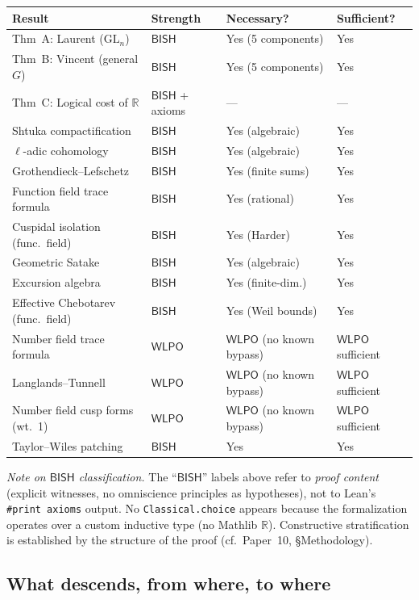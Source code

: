 \documentclass[11pt]{article}
\theoremstyle{plain}
\theoremstyle{definition}
\theoremstyle{remark}
\newcommand{\R}{\mathbb{R}}
\newcommand{\GL}{\mathrm{GL}}
\newcommand{\BISH}{\mathsf{BISH}}
\newcommand{\WLPO}{\mathsf{WLPO}}
\begin{document}
\begin{center}
\begin{tabular}{llll}
\toprule
\textbf{Result} & \textbf{Strength} & \textbf{Necessary?} & \textbf{Sufficient?} \\
\midrule
Thm~A: Laurent ($\GL_n$) & $\BISH$ & Yes (5 components) & Yes \\
Thm~B: Vincent (general $G$) & $\BISH$ & Yes (5 components) & Yes \\
Thm~C: Logical cost of $\R$ & $\BISH$ + axioms & --- & --- \\
\midrule
Shtuka compactification & $\BISH$ & Yes (algebraic) & Yes \\
$\ell$-adic cohomology & $\BISH$ & Yes (algebraic) & Yes \\
Grothendieck--Lefschetz & $\BISH$ & Yes (finite sums) & Yes \\
Function field trace formula & $\BISH$ & Yes (rational) & Yes \\
Cuspidal isolation (func.\ field) & $\BISH$ & Yes (Harder) & Yes \\
Geometric Satake & $\BISH$ & Yes (algebraic) & Yes \\
Excursion algebra & $\BISH$ & Yes (finite-dim.) & Yes \\
Effective Chebotarev (func.\ field) & $\BISH$ & Yes (Weil bounds) & Yes \\
\midrule
Number field trace formula & $\WLPO$ & $\WLPO$ (no known bypass) & $\WLPO$ sufficient \\
Langlands--Tunnell & $\WLPO$ & $\WLPO$ (no known bypass) & $\WLPO$ sufficient \\
Number field cusp forms (wt.~1) & $\WLPO$ & $\WLPO$ (no known bypass) & $\WLPO$ sufficient \\
Taylor--Wiles patching & $\BISH$ & Yes & Yes \\
\bottomrule
\end{tabular}
\end{center}

\smallskip\noindent
\emph{Note on $\BISH$ classification.} The ``$\BISH$'' labels above refer to
\emph{proof content} (explicit witnesses, no omniscience principles as
hypotheses), not to Lean's \texttt{\#print axioms} output. No
\texttt{Classical.choice} appears because the formalization operates over
a custom inductive type (no Mathlib $\R$). Constructive stratification is
established by the structure of the proof (cf.\ Paper~10, \S Methodology).

\subsection{What descends, from where, to where}
\end{document}
